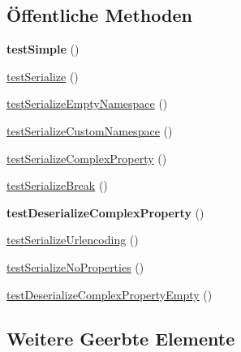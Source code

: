 \subsection*{Öffentliche Methoden}
\begin{DoxyCompactItemize}
\item 
\mbox{\label{class_sabre_1_1_d_a_v_1_1_xml_1_1_element_1_1_response_test_a41890dd4f3ffdec2bea29f83f03f42d3}} 
{\bfseries test\+Simple} ()
\item 
\mbox{\hyperlink{class_sabre_1_1_d_a_v_1_1_xml_1_1_element_1_1_response_test_a63d65a19be4c08c85fe51db4a8b03aea}{test\+Serialize}} ()
\item 
\mbox{\hyperlink{class_sabre_1_1_d_a_v_1_1_xml_1_1_element_1_1_response_test_a6c9a636eafae3fc6f953cb1d4f8edae5}{test\+Serialize\+Empty\+Namespace}} ()
\item 
\mbox{\hyperlink{class_sabre_1_1_d_a_v_1_1_xml_1_1_element_1_1_response_test_a85d447e26ee1fde5a8fd11c15d0055bd}{test\+Serialize\+Custom\+Namespace}} ()
\item 
\mbox{\hyperlink{class_sabre_1_1_d_a_v_1_1_xml_1_1_element_1_1_response_test_aa341a6508a6a6e1ca6dc81788ddbad7c}{test\+Serialize\+Complex\+Property}} ()
\item 
\mbox{\hyperlink{class_sabre_1_1_d_a_v_1_1_xml_1_1_element_1_1_response_test_abbebe913a835500ddb8fbebe25a750b8}{test\+Serialize\+Break}} ()
\item 
\mbox{\label{class_sabre_1_1_d_a_v_1_1_xml_1_1_element_1_1_response_test_a2148096ae20610d1257d41aa8bf5321f}} 
{\bfseries test\+Deserialize\+Complex\+Property} ()
\item 
\mbox{\hyperlink{class_sabre_1_1_d_a_v_1_1_xml_1_1_element_1_1_response_test_a9d1f81068021b06d1eb8b516db47895b}{test\+Serialize\+Urlencoding}} ()
\item 
\mbox{\hyperlink{class_sabre_1_1_d_a_v_1_1_xml_1_1_element_1_1_response_test_a2257f4dfc9bdd087b6f871cbb85276ec}{test\+Serialize\+No\+Properties}} ()
\item 
\mbox{\hyperlink{class_sabre_1_1_d_a_v_1_1_xml_1_1_element_1_1_response_test_ae0229e4252103e39375dceb89952a96f}{test\+Deserialize\+Complex\+Property\+Empty}} ()
\end{DoxyCompactItemize}
\subsection*{Weitere Geerbte Elemente}


